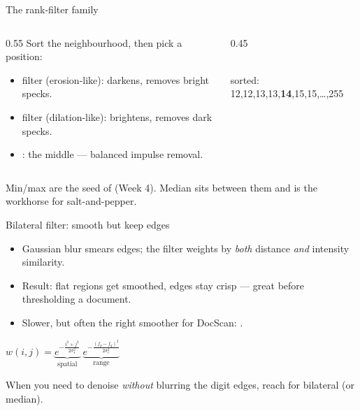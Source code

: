 \documentclass[10pt,aspectratio=169]{beamer}
\begin{document}
\begin{frame}{The rank-filter family}
  \begin{columns}[T]
    \begin{column}{0.55\textwidth}
      Sort the neighbourhood, then pick a position:
      \begin{itemize}
        \item {} filter (erosion-like): darkens, removes bright specks.
        \item {} filter (dilation-like): brightens, removes dark specks.
        \item {}: the middle — balanced impulse removal.
      \end{itemize}
    \end{column}
    \begin{column}{0.45\textwidth}
      \begin{center}
      \\[3pt]
      {\scriptsize sorted: 12,12,13,13,\textbf{14},15,15,\dots,255}
      \end{center}
    \end{column}
  \end{columns}
  \begin{infobox}
    Min/max are the seed of  (Week 4). Median sits between them and is the
    workhorse for salt-and-pepper.
  \end{infobox}
\end{frame}

\begin{frame}{Bilateral filter: smooth but keep edges}
  \begin{itemize}
    \item Gaussian blur smears edges; the  filter weights by \emph{both} distance \emph{and} intensity similarity.
    \item Result: flat regions get smoothed, edges stay crisp — great before thresholding a document.
    \item Slower, but often the right smoother for DocScan: .
  \end{itemize}
  \begin{mathbox}
    $w(i,j)=\underbrace{e^{-\frac{i^2+j^2}{2\sigma_s^2}}}_{\text{spatial}}\;
             \underbrace{e^{-\frac{(f_p-f_q)^2}{2\sigma_r^2}}}_{\text{range}}$
  \end{mathbox}
  \begin{goodbox}
    When you need to denoise \emph{without} blurring the digit edges, reach for bilateral (or median).
  \end{goodbox}
\end{frame}
\end{document}

